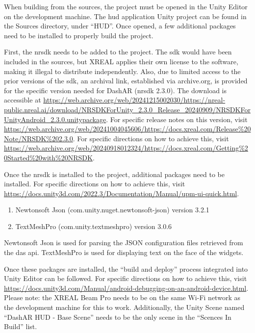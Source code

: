             \par When building from the sources, the project must be opened in the Unity Editor on the development machine. The \gls{hud} application Unity project can be found in the Sources directory, under ``HUD''. Once opened, a few additional packages need to be installed to properly build the project.

            \par First, the \gls{nrsdk} needs to be added to the project. The \gls{sdk} would have been included in the sources, but XREAL applies their own license to the software, making it illegal to distribute independently. Also, due to limited access to the prior versions of the \gls{sdk}, an archival link, established via archive.org, is provided for the specific version needed for DashAR (\gls{nrsdk} 2.3.0). The download is accessible at \url{https://web.archive.org/web/20241215002030/https://nreal-public.nreal.ai/download/NRSDKForUnity_2.3.0_Release_20240909/NRSDKForUnityAndroid_2.3.0.unitypackage}. For specific release notes on this version, visit \url{https://web.archive.org/web/20241004045606/https://docs.xreal.com/Release%20Note/NRSDK%202.3.0}. For specific directions on how to achieve this, visit \url{https://web.archive.org/web/20240918012324/https://docs.xreal.com/Getting%20Started%20with%20NRSDK}.

            \par Once the \gls{nrsdk} is installed to the project, additional packages need to be installed. For specific directions on how to achieve this, visit \url{https://docs.unity3d.com/2022.3/Documentation/Manual/upm-ui-quick.html}.

            \begin{enumerate}
                \item Newtonsoft Json (com.unity.nuget.newtonsoft-json) version 3.2.1
                \item TextMeshPro (com.unity.textmeshpro) version 3.0.6
            \end{enumerate}

            \par Newtonsoft Json is used for parsing the JSON configuration files retrieved from the \gls{das} \gls{api}. TextMeshPro is used for displaying text on the face of the widgets.

            \par Once these packages are installed, the ``build and deploy'' process integrated into Unity Editor can be followed. For specific directions on how to achieve this, visit \url{https://docs.unity3d.com/Manual/android-debugging-on-an-android-device.html}. Please note: the XREAL Beam Pro needs to be on the same Wi-Fi network as the development machine for this to work. Additionally, the Unity Scene named ``DashAR HUD - Base Scene'' needs to be the only scene in the ``Scences In Build'' list.

